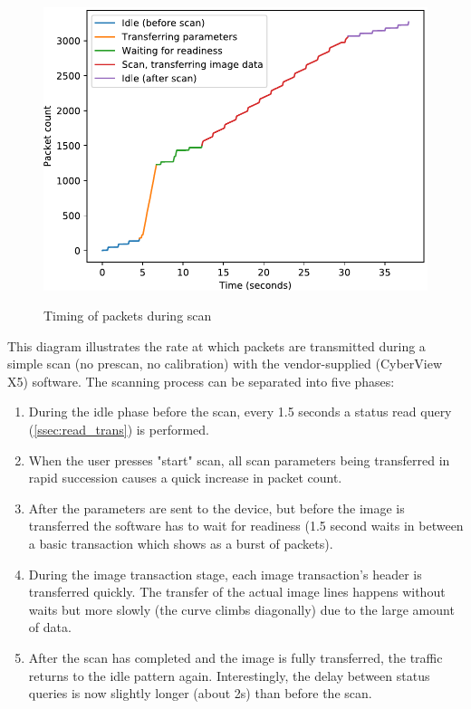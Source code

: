 \documentclass{article}
\begin{document}
\begin{figure}[H]
  \caption{Timing of packets during scan}
  \centering
  \includegraphics[width=\textwidth]{images/time_diagram.pdf}
  \label{time_diagram}
\end{figure}

This diagram illustrates the rate at which packets are transmitted
during a simple scan (no prescan, no calibration) with the vendor-supplied
(CyberView X5) software.
The scanning process can be separated into five phases:

\begin{enumerate}

\item During the idle phase before the scan, every 1.5 seconds a status read query
(\ref{ssec:read_trans}) is performed.

\item When the user presses "start" scan, all scan parameters being transferred
in rapid succession causes a quick increase in packet count.

\item After the parameters are sent to the device, but before the image is transferred
the software has to wait for readiness (1.5 second waits in between a basic transaction
which shows as a burst of packets).

\item During the image transaction stage, each image transaction's header is
transferred quickly. The transfer of the actual image lines happens without waits
but more slowly (the curve climbs diagonally) due to the large amount of data.

\item After the scan has completed and the image is fully transferred,
the traffic returns to the idle pattern again. Interestingly, the delay
between status queries is now slightly longer (about 2s) than before the scan.

\end{enumerate}
\end{document}
